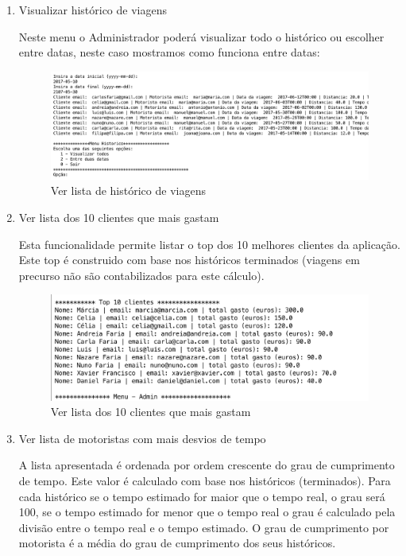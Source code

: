 \begin{enumerate}
\newpage
\item Visualizar histórico de viagens 

Neste menu o Administrador poderá visualizar todo o histórico ou escolher entre datas, neste caso mostramos como funciona entre datas: 
\begin{figure}[htpb]
	\centering
	\includegraphics[scale=0.5]{imagem/verListaHistorico}
	\caption{Ver lista de histórico de viagens }
	\label{p3:fig:p3_verListaHistorico}
\end{figure}

\item Ver lista dos 10 clientes que mais gastam 

Esta funcionalidade permite listar o top dos 10 melhores clientes da aplicação. 
Este top é construido com base nos históricos terminados (viagens em precurso não são contabilizados para este cálculo). 

\begin{figure}[htpb]
	\centering
	\includegraphics[scale=0.5]{imagem/verClientesMaisGastam}
	\caption{Ver  lista dos 10 clientes que mais gastam  }
	\label{p3:fig:p3_verClientesMaisGastam}
\end{figure}

\item Ver lista de motoristas com mais desvios de tempo 

A lista apresentada é ordenada por ordem crescente do grau de cumprimento de tempo. Este valor é calculado com base nos históricos (terminados). Para cada histórico se o tempo estimado for maior que o tempo real, o grau será 100, se o tempo estimado for menor que o tempo real o grau é calculado pela divisão entre o tempo real e o tempo estimado. O grau de cumprimento por motorista é a média do grau de cumprimento dos seus históricos.  


\end{enumerate}

